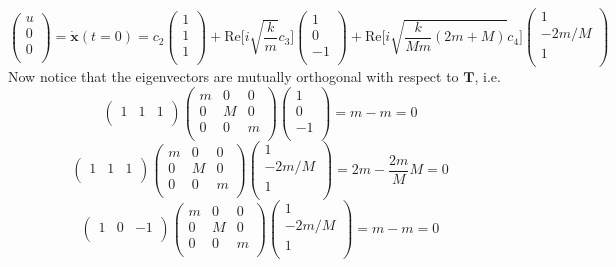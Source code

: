 \documentclass[a4paper]{article}
\begin{document}
\begin{ans}
\begin{enumerate}[label=(\roman*)]
$$\begin{pmatrix}u\\0\\0\\\end{pmatrix}=\mathbf{\dot{x}}(t=0)=c_2\begin{pmatrix}1\\1\\1\\\end{pmatrix}+\text{Re}\bigg[i\sqrt{\frac{k}{m}}c_3\bigg]\begin{pmatrix}1\\0\\-1\\\end{pmatrix}+\text{Re}\bigg[i\sqrt{\frac{k}{Mm}(2m+M)}c_4\bigg]\begin{pmatrix}1\\-2m/M\\1\\\end{pmatrix}$$
Now notice that the eigenvectors are mutually orthogonal with respect to $\mathbf{T}$, i.e.
$$\begin{pmatrix}1&1&1\\\end{pmatrix}\begin{pmatrix}m&0&0\\0&M&0\\0&0&m\\\end{pmatrix}\begin{pmatrix}1\\0\\-1\\\end{pmatrix}=m-m=0$$ $$\begin{pmatrix}1&1&1\\\end{pmatrix}\begin{pmatrix}m&0&0\\0&M&0\\0&0&m\\\end{pmatrix}\begin{pmatrix}1\\-2m/M\\1\\\end{pmatrix}=2m-\frac{2m}{M}M=0$$
$$\begin{pmatrix}1&0&-1\\\end{pmatrix}\begin{pmatrix}m&0&0\\0&M&0\\0&0&m\\\end{pmatrix}\begin{pmatrix}1\\-2m/M\\1\\\end{pmatrix}=m-m=0$$

\end{enumerate}
\end{ans}
\end{document}
